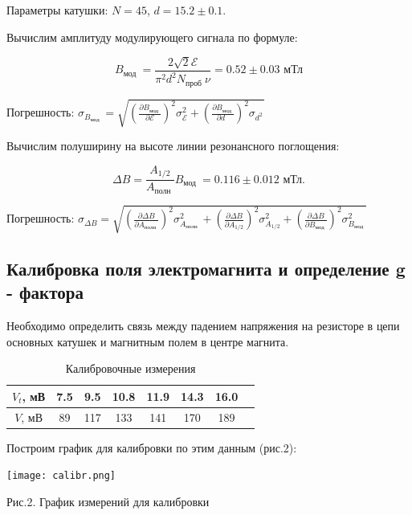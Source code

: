 \documentclass[14pt,a4paper]{scrartcl}
\begin{document}
Параметры катушки: $N = 45$, $d = 15.2 \pm 0.1$. 


Вычислим амплитуду модулирующего сигнала по формуле:

$$
B_{\text {мод }}=\frac{2 \sqrt{2} \mathcal{E}}{\pi^{2} d^{2} N_{\text {проб } }  \nu} = 0.52 \pm 0.03 \text{ мТл}
$$

Погрешность: $\sigma_{B_{\text {мод }}}=\sqrt{\left(\frac{\partial B_{\text {мод }}}{\partial \mathcal{E}}\right)^{2} \sigma_{\mathcal{E}}^{2}+\left(\frac{\partial B_{\text {мод }}}{\partial d_{\text { }}}\right)^{2} \sigma_{d_{\text { } }^{2}}}$

Вычислим полуширину на высоте линии резонансного поглощения:

$$
\Delta B=\frac{A_{1 / 2}}{A_{\text {полн }}} B_{\text {мод }} = 0.116 \pm 0.012 \text{ мТл.}
$$

Погрешность: $\sigma_{\Delta B}=\sqrt{\left(\frac{\partial \Delta B}{\partial A_{\text {полн }}}\right)^{2} \sigma_{A_{\text {полн }}}^{2}+\left(\frac{\partial \Delta B}{\partial A_{1 / 2}}\right)^{2} \sigma_{A_{1 / 2}}^{2}+\left(\frac{\partial \Delta B}{\partial B_{\text {мод }}}\right)^{2} \sigma_{B_{\text {мод }}}^{2}}$

\subsection{Калибровка поля электромагнита и определение g - фактора}

Необходимо определить связь между падением напряжения на резисторе в цепи основных катушек и магнитным полем в центре магнита.


\begin{table}[h]
    \centering
    \begin{tabular}{|c|c|c|c|c|c|c|c|}
    \hline
        $V_t$, мВ & 7.5 & 9.5 & 10.8 & 11.9 & 14.3 & 16.0 \\ \hline
        $V$, мВ & 89 & 117 & 133 & 141 & 170 & 189 \\ \hline
    \end{tabular}
    \caption{Калибровочные измерения}
\end{table}

Построим график для калибровки по этим данным (рис.2):


\begin{center}
\texttt{[image: calibr.png]}\newline
\caption{Рис.2. График измерений для калибровки}
\end{center}
\end{document}
